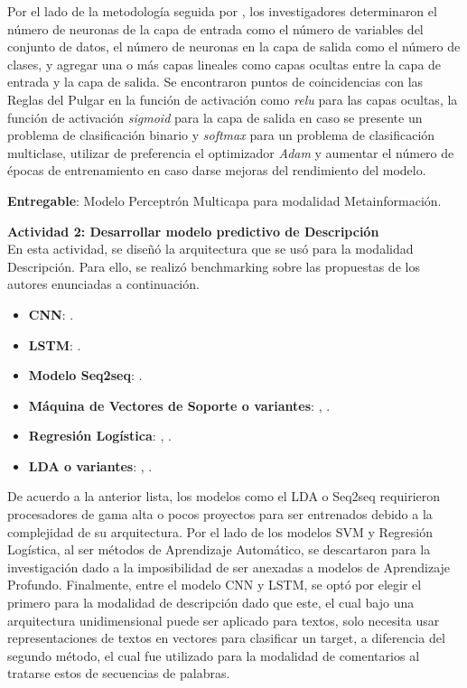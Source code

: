 Por el lado de la metodología seguida por \citeauthor{pr_yu2018deeplearning}, los investigadores determinaron el número de neuronas de la capa de entrada como el número de variables del conjunto de datos, el número de neuronas en la capa de salida como el número de clases, y agregar una o más capas lineales como capas ocultas entre la capa de entrada y la capa de salida. Se encontraron puntos de coincidencias con las Reglas del Pulgar en la función de activación como \textit{relu} para las capas ocultas, la función de activación \textit{sigmoid} para la capa de salida en caso se presente un problema de clasificación binario y \textit{softmax} para un problema de clasificación multiclase, utilizar de preferencia el optimizador \textit{Adam} y aumentar el número de épocas de entrenamiento en caso darse mejoras del rendimiento del modelo.

\textbf{Entregable}: Modelo Perceptrón Multicapa para modalidad Metainformación.

\vspace{0.3cm}
\textbf{Actividad 2: Desarrollar modelo predictivo de Descripción}
\\
En esta actividad, se diseñó la arquitectura que se usó para la modalidad Descripción. Para ello, se realizó benchmarking sobre las propuestas de los autores enunciadas a continuación.

\begin{itemize}
	\item \textbf{CNN}: \cite{pr_cheng2019deeplearning}.
	\item \textbf{LSTM}: \cite{pr_jin2019dayssuccess}.
	\item \textbf{Modelo Seq2seq}: \cite{pr_lee2018contentDL}.
	\item \textbf{Máquina de Vectores de Soporte o variantes}: \cite{pr_sawhney2016usingLT}, \cite{pr_chen2019keywords_crowdfunding}.
	\item \textbf{Regresión Logística}: \cite{pr_mitra2014phrases}, \cite{pr_zhou2015projectdesc}.
	\item \textbf{LDA o variantes}: \cite{pr_yuan2016textanalytics}, \cite{pr_sawhney2016usingLT}.
\end{itemize}

De acuerdo a la anterior lista, los modelos como el LDA o Seq2seq requirieron procesadores de gama alta o pocos proyectos para ser entrenados debido a la complejidad de su arquitectura. Por el lado de los modelos SVM y Regresión Logística, al ser métodos de Aprendizaje Automático, se descartaron para la investigación dado a la imposibilidad de ser anexadas a modelos de Aprendizaje Profundo. Finalmente, entre el modelo CNN y LSTM, se optó por elegir el primero para la modalidad de descripción dado que este, el cual bajo una arquitectura unidimensional puede ser aplicado para textos, solo necesita usar representaciones de textos en vectores para clasificar un target, a diferencia del segundo método, el cual fue utilizado para la modalidad de comentarios al tratarse estos de secuencias de palabras.

